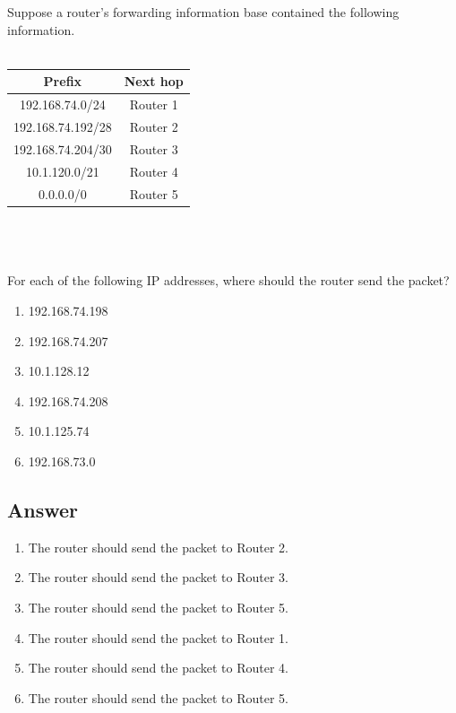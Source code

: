 \documentclass[10pt]{article}
\newenvironment{problem}[2][Problem]{\begin{trivlist}
\item[\hskip \labelsep {\bfseries #1}\hskip \labelsep {\bfseries #2.}]}{\end{trivlist}}
\begin{document}
\begin{problem}{2: Longest Matching Prefix}

Suppose a router's forwarding information base contained the following information.
\\\\
\begin{tabular}{|c|c|}
\hline
\textbf{Prefix} & \textbf{Next hop} \\
\hline
192.168.74.0/24 & Router 1 \\
\hline
192.168.74.192/28 & Router 2 \\
\hline
192.168.74.204/30 & Router 3 \\
\hline
10.1.120.0/21 & Router 4 \\
\hline
0.0.0.0/0 & Router 5 \\
\hline
\end{tabular}
\\\\\\
For each of the following IP addresses, where should the router send the packet?
\begin{enumerate}
    \item 192.168.74.198
    \item 192.168.74.207
    \item 10.1.128.12
    \item 192.168.74.208
    \item 10.1.125.74
    \item 192.168.73.0
\end{enumerate}

\subsection*{Answer}
\begin{enumerate}
    \item The router should send the packet to Router 2.
    \item The router should send the packet to Router 3.
    \item The router should send the packet to Router 5.
    \item The router should send the packet to Router 1.
    \item The router should send the packet to Router 4.
    \item The router should send the packet to Router 5.
\end{enumerate}

\end{problem}
\end{document}
